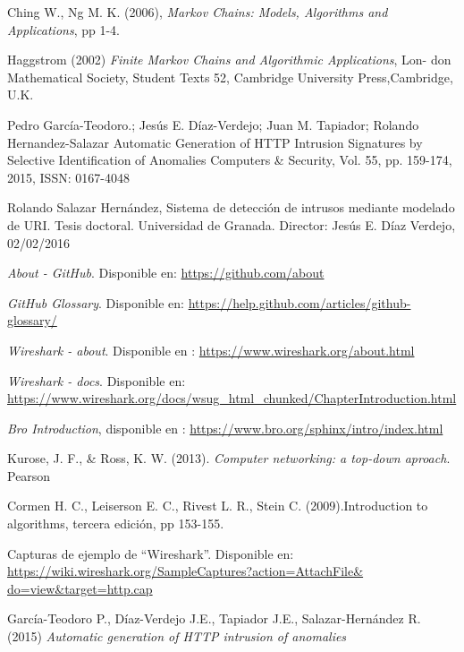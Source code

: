 \begin{thebibliography}{99}
Ching W., Ng M. K. (2006), \textit{Markov Chains: Models, Algorithms and Applications}, pp 1-4.

Haggstrom (2002) \textit{Finite Markov Chains and Algorithmic Applications}, Lon-
don Mathematical Society, Student Texts 52, Cambridge University Press,Cambridge, U.K.

Pedro García-Teodoro.; Jesús E. Díaz-Verdejo; Juan M. Tapiador; Rolando Hernandez-Salazar
Automatic Generation of HTTP Intrusion Signatures by Selective Identification of Anomalies
Computers \& Security, Vol. 55, pp. 159-174, 2015, ISSN: 0167-4048 

Rolando Salazar Hernández, Sistema de detección de intrusos mediante modelado de URI. Tesis doctoral. Universidad de Granada. Director: Jesús E. Díaz Verdejo, 02/02/2016

 \textit{About - GitHub}. Disponible en: \url{https://github.com/about}

 \textit{GitHub Glossary}. Disponible en: \url{https://help.github.com/articles/github-glossary/}

 \textit{Wireshark - about}. Disponible en : \url{https://www.wireshark.org/about.html}

 \textit{Wireshark - docs}. Disponible en: \url{https://www.wireshark.org/docs/wsug_html_chunked/ChapterIntroduction.html}

\textit{Bro Introduction}, disponible en : \url{https://www.bro.org/sphinx/intro/index.html}

Kurose, J. F., \& Ross, K. W. (2013). \textit{Computer networking: a top-down aproach}. Pearson

 Cormen H. C., Leiserson E. C., Rivest L. R., Stein C. (2009).Introduction to algorithms, tercera edición, pp 153-155.

 Capturas de ejemplo de “Wireshark”. Disponible en:  \url{https://wiki.wireshark.org/SampleCaptures?action=AttachFile&
do=view&target=http.cap}

 García-Teodoro P., Díaz-Verdejo J.E., Tapiador J.E., Salazar-Hernández R. (2015) \textit{Automatic generation of HTTP intrusion of anomalies}

\end{thebibliography}